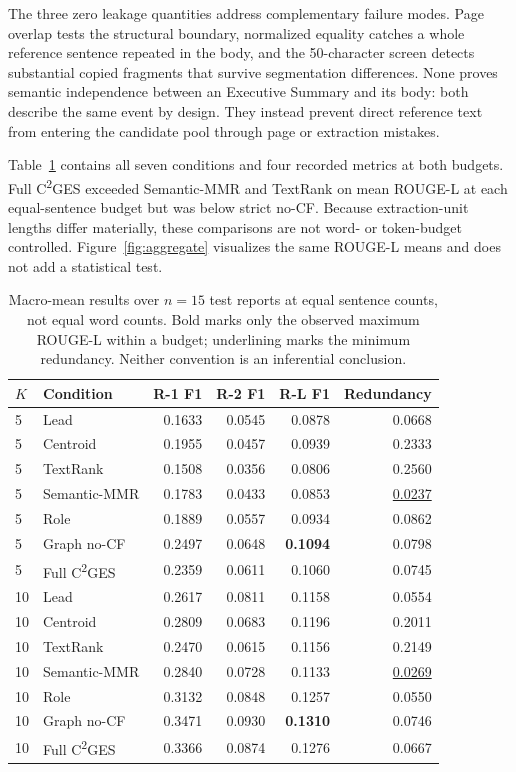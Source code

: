 \documentclass[applsci,article,submit,moreauthors]{Definitions/mdpi}
\newcommand{\cges}{C\textsuperscript{2}GES}
\begin{document}
The three zero leakage quantities address complementary failure modes. Page overlap tests the structural boundary, normalized equality catches a whole reference sentence repeated in the body, and the 50-character screen detects substantial copied fragments that survive segmentation differences. None proves semantic independence between an Executive Summary and its body: both describe the same event by design. They instead prevent direct reference text from entering the candidate pool through page or extraction mistakes.

Table~\ref{tab:all-results} contains all seven conditions and four recorded metrics at both budgets. Full \cges{} exceeded Semantic-MMR and TextRank on mean ROUGE-L at each equal-sentence budget but was below strict no-CF. Because extraction-unit lengths differ materially, these comparisons are not word- or token-budget controlled. Figure~\ref{fig:aggregate} visualizes the same ROUGE-L means and does not add a statistical test.

\begin{table}[H]
\caption{Macro-mean results over $n=15$ test reports at equal sentence counts, not equal word counts. Bold marks only the observed maximum ROUGE-L within a budget; underlining marks the minimum redundancy. Neither convention is an inferential conclusion.}
\label{tab:all-results}\centering\small
\begin{tabular}{llrrrr}
\toprule
$K$ & Condition & R-1 F1 & R-2 F1 & R-L F1 & Redundancy\\
\midrule
5 & Lead & 0.1633 & 0.0545 & 0.0878 & 0.0668\\
5 & Centroid & 0.1955 & 0.0457 & 0.0939 & 0.2333\\
5 & TextRank & 0.1508 & 0.0356 & 0.0806 & 0.2560\\
5 & Semantic-MMR & 0.1783 & 0.0433 & 0.0853 & \underline{0.0237}\\
5 & Role & 0.1889 & 0.0557 & 0.0934 & 0.0862\\
5 & Graph no-CF & 0.2497 & 0.0648 & \textbf{0.1094} & 0.0798\\
5 & Full \cges{} & 0.2359 & 0.0611 & 0.1060 & 0.0745\\
\midrule
10 & Lead & 0.2617 & 0.0811 & 0.1158 & 0.0554\\
10 & Centroid & 0.2809 & 0.0683 & 0.1196 & 0.2011\\
10 & TextRank & 0.2470 & 0.0615 & 0.1156 & 0.2149\\
10 & Semantic-MMR & 0.2840 & 0.0728 & 0.1133 & \underline{0.0269}\\
10 & Role & 0.3132 & 0.0848 & 0.1257 & 0.0550\\
10 & Graph no-CF & 0.3471 & 0.0930 & \textbf{0.1310} & 0.0746\\
10 & Full \cges{} & 0.3366 & 0.0874 & 0.1276 & 0.0667\\
\bottomrule
\end{tabular}
\end{table}
\end{document}
